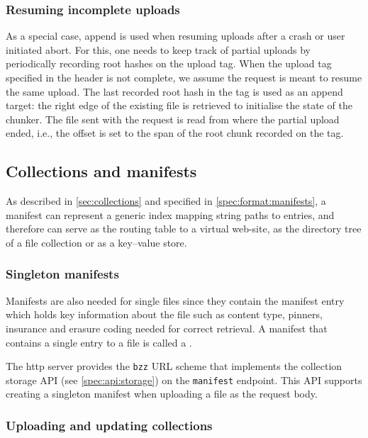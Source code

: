 \subsubsection{Resuming incomplete uploads}\label{sec:resume}

As a special case, append is used when resuming uploads after a crash or user initiated abort. For this, one needs to keep track of partial uploads by periodically recording root hashes on the upload tag. When the upload tag specified in the header is not complete, we assume the request is meant to resume the same upload. The last recorded root hash in the tag is used as an append target: the right edge of the existing file is retrieved to initialise the state of the chunker. The file sent with the request is read from where the partial upload ended, i.e., the offset is set to the span of the root chunk recorded on the tag.

\subsection{Collections and manifests \statusgreen}\label{sec:manifests-ux}

As described in \ref{sec:collections} and specified in \ref{spec:format:manifests}, a manifest can represent a generic index mapping string paths to entries, and therefore can serve as the routing table to a virtual web-site, as the directory tree of a file collection or as a key--value store. 

\subsubsection{Singleton manifests}

Manifests are also needed for single files since they contain the manifest entry which holds key information about the file such as content type, pinners, insurance and erasure coding needed for correct retrieval. A manifest that contains a single entry to a file is called a .

The http server provides the \lstinline{bzz} URL scheme that implements the collection storage API (see  \ref{spec:api:storage}) on the \lstinline{manifest} endpoint. This API supports creating a singleton manifest when uploading a file as the request body. 

\subsubsection{Uploading and updating collections}

